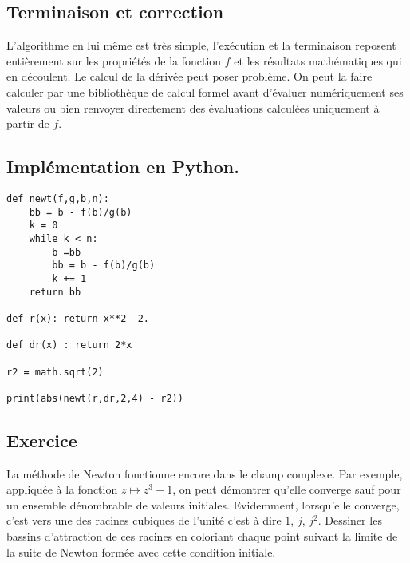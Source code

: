 \subsection{Terminaison et correction}
L'algorithme en lui même est très simple, l'exécution et la terminaison reposent entièrement sur les propriétés de la fonction $f$ et les résultats mathématiques qui en découlent.\newline
Le calcul de la dérivée peut poser problème. On peut la faire calculer par une bibliothèque de calcul formel avant d'évaluer numériquement ses valeurs ou bien renvoyer directement des évaluations calculées uniquement à partir de $f$.

\subsection{Implémentation en Python.}
\begin{verbatim}
def newt(f,g,b,n):
    bb = b - f(b)/g(b)
    k = 0
    while k < n:
        b =bb
        bb = b - f(b)/g(b)
        k += 1
    return bb
    
def r(x): return x**2 -2.
    
def dr(x) : return 2*x

r2 = math.sqrt(2)

print(abs(newt(r,dr,2,4) - r2))
\end{verbatim}

\subsection{Exercice}
La méthode de Newton fonctionne encore dans le champ complexe. Par exemple, appliquée à la fonction $z\mapsto z^3 -1$, on peut démontrer qu'elle converge sauf pour un ensemble dénombrable de valeurs initiales. Evidemment, lorsqu'elle converge, c'est vers une des racines cubiques de l'unité c'est à dire $1$, $j$, $j^2$.\newline
Dessiner les bassins d'attraction de ces racines en coloriant chaque point suivant la limite de la suite de Newton formée avec cette condition initiale.

